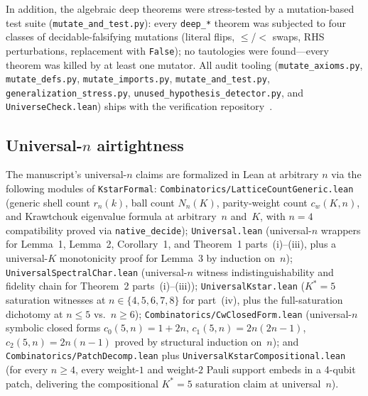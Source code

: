 \documentclass[twocolumn,prx,aps,superscriptaddress,longbibliography]{revtex4-2}
\begin{document}
\begin{sloppypar}\raggedright
In addition, the algebraic deep theorems were stress-tested by a
mutation-based test suite
(\texttt{mutate\_and\_test.py}): every \texttt{deep\_*} theorem was
subjected to four classes of decidable-falsifying mutations
(literal flips, $\le$/$<$ swaps, RHS perturbations, replacement
with \texttt{False}); no tautologies were found---every theorem
was killed by at least one mutator. All audit tooling
(\texttt{mutate\_axioms.py},\allowbreak{} \texttt{mutate\_defs.py},\allowbreak{}
\texttt{mutate\_imports.py},\allowbreak{} \texttt{mutate\_and\_test.py},\allowbreak{}
\texttt{generalization\_stress.py},\allowbreak{}
\texttt{unused\_hypothesis\_detector.py}, and
\texttt{UniverseCheck.lean}) ships with the
verification repository~\cite{github_verification}.
\end{sloppypar}

\subsection{Universal-$n$ airtightness}
\label{sm:lean-universal}

\begin{sloppypar}\raggedright
The manuscript's universal-$n$ claims are formalized in Lean
at arbitrary $n$ via the following modules of
\texttt{KstarFormal}:
\texttt{Combinatorics/\allowbreak{}LatticeCountGeneric.lean}
(generic shell count $r_n(k)$, ball count $N_n(K)$, parity-weight
count $c_w(K,n)$, and Krawtchouk eigenvalue formula at arbitrary~$n$
and~$K$, with $n=4$ compatibility proved via \texttt{native\_decide});
\texttt{Universal.lean} (universal-$n$ wrappers for Lemma~1,
Lemma~2, Corollary~1, and Theorem~1 parts~(i)--(iii), plus a
universal-$K$ monotonicity proof for Lemma~3 by induction on~$n$);
\texttt{UniversalSpectralChar.lean} (universal-$n$ witness
indistinguishability and fidelity chain for Theorem~2 parts~(i)--(iii));
\texttt{UniversalKstar.lean} ($K^*{=}5$ saturation witnesses at
$n\in\{4,5,6,7,8\}$ for part~(iv), plus the full-saturation dichotomy
at $n\le5$ vs.\ $n\ge6$);
\texttt{Combinatorics/\allowbreak{}CwClosedForm.lean} (universal-$n$
symbolic closed forms $c_0(5,n)=1+2n$, $c_1(5,n)=2n(2n{-}1)$,
$c_2(5,n)=2n(n{-}1)$ proved by structural induction on~$n$);
and \texttt{Combinatorics/\allowbreak{}PatchDecomp.lean} plus
\texttt{UniversalKstarCompositional.lean} (for every $n\ge4$,
every weight-$1$ and weight-$2$ Pauli support embeds in a
4-qubit patch, delivering the compositional $K^*{=}5$ saturation
claim at universal~$n$).
\end{sloppypar}
\end{document}
